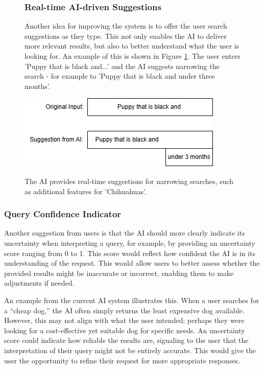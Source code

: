 \documentclass[../../submission.tex]{subfiles}
\begin{document}
\begin{figure}[h]
    \centering
    \begin{minipage}{0.35\textwidth}
        \subsubsection{Real-time AI-driven Suggestions}
        Another idea for improving the system is to offer the user search suggestions as they type. 
        This not only enables the AI to deliver more relevant results, but also to better understand what the user is looking for.
        An example of this is shown in Figure \ref{fig:suggestions}. The user enters 'Puppy that is black and...' and the AI suggests narrowing the 
        search - for example to 'Puppy that is black and under three months'.
    \end{minipage}
    \hfill
    \begin{minipage}{0.55\textwidth}
        \includegraphics[width=\textwidth]{images/vorschlag}
        \caption{The AI provides real-time suggestions for narrowing searches, such as additional features for 'Chihuahuas'.}
        \Description{}
        \label{fig:suggestions}
    \end{minipage}
\end{figure}
 

 
 \subsubsection{Query Confidence Indicator}   
 
 Another suggestion from users is that the AI should more clearly indicate its uncertainty 
 when interpreting a query, for example, by providing an uncertainty score ranging from 
 0 to 1. This score would reflect how confident the AI is in its understanding of the 
 request. This would allow users to better assess whether the provided results might 
 be inaccurate or incorrect, enabling them to make adjustments if needed.

 An example from the current AI system illustrates this. When a user searches for 
 a “cheap dog,” the AI often simply returns the least expensive dog available. 
 However, this may not align with what the user intended; perhaps they were looking 
 for a cost-effective yet suitable dog for specific needs. An uncertainty score could 
 indicate how reliable the results are, signaling to the user that the interpretation 
 of their query might not be entirely accurate. This would give the user the opportunity 
 to refine their request for more appropriate responses.
\end{document}
